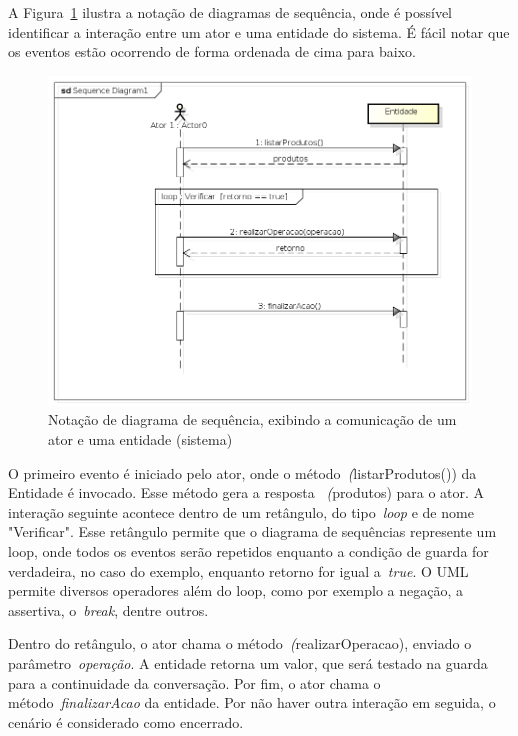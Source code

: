 A Figura~\ref{fig:exemplo-diagrama-sequencia} ilustra a notação de diagramas de sequência, onde é possível identificar a interação entre um ator e uma entidade do sistema. É fácil notar que os eventos estão ocorrendo de forma ordenada de cima para baixo.
\begin{figure}
	\centering
	\includegraphics[scale=0.75]{images/exemplo-diagrama-sequencia.png}
	\caption{Notação de diagrama de sequência, exibindo a comunicação de um ator e uma entidade (sistema)}
	\label{fig:exemplo-diagrama-sequencia}
\end{figure}

O primeiro evento é iniciado pelo ator, onde o método~\emph(listarProdutos()) da Entidade é invocado. Esse método gera a resposta ~\emph(produtos) para o ator. A interação seguinte acontece dentro de um retângulo, do tipo~\emph{loop} e de nome "Verificar". Esse retângulo permite que o diagrama de sequências represente um loop, onde todos os eventos serão repetidos enquanto a condição de guarda for verdadeira, no caso do exemplo, enquanto retorno for igual a~\emph{true}. O UML permite diversos operadores além do loop, como por exemplo a negação, a assertiva, o~\emph{break}, dentre outros.

Dentro do retângulo, o ator chama o método~\emph(realizarOperacao), enviado o parâmetro~\emph{operação}. A entidade retorna um valor, que será testado na guarda para a continuidade da conversação. Por fim, o ator chama o método~\emph{finalizarAcao} da entidade. Por não haver outra interação em seguida, o cenário é considerado como encerrado. 


